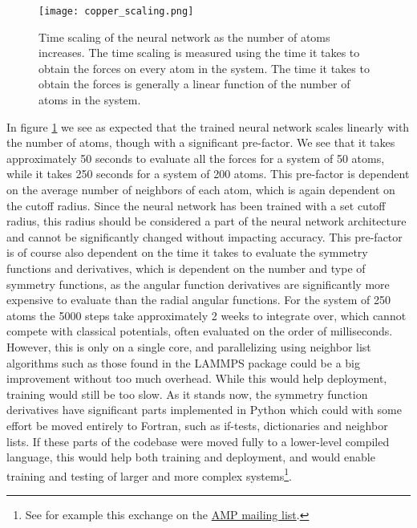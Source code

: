 \begin{figure}
\texttt{[image: copper\_scaling.png]}
\caption{Time scaling of the neural network as the number of atoms increases.
    The time scaling is measured using the time it takes to obtain
    the forces on every atom in the system. The time it takes to obtain
    the forces is generally a linear function of the number of atoms
    in the system.}
\label{fig:copper-scaling}
\end{figure}

In figure \ref{fig:copper-scaling} we see as expected that the 
trained neural network
scales linearly with the number of atoms, though with a significant pre-factor.
We see that it takes approximately 50 seconds to evaluate all the forces
for a system of 50 atoms, while it takes 250 seconds for a system of 200 atoms.
This pre-factor is dependent on the average number of neighbors
of each atom, which is again dependent on the cutoff radius.
Since the neural network has been trained with a set cutoff radius,
this radius should be considered a part of the neural network architecture
and cannot be significantly changed without impacting accuracy.
This pre-factor is of course also dependent on the time it takes to evaluate
the symmetry functions and derivatives, which is dependent on the number
and type of symmetry functions, as the angular function derivatives are significantly
more expensive to evaluate than the radial angular functions.
For the system of 250 atoms the 5000 steps take approximately 2 weeks
to integrate over, which cannot compete with classical potentials,
often evaluated on the order of milliseconds.
However, this is only on a single core, 
and parallelizing using neighbor list algorithms
such as those found in the LAMMPS package 
could be a big improvement without too much overhead.
While this would help deployment, training would still be too slow.
As it stands now, the symmetry function derivatives have significant parts
implemented in Python which could with some effort be moved entirely to Fortran,
such as if-tests, dictionaries and neighbor lists.
If these parts of the codebase were moved fully to a lower-level compiled
language, this would help both training and deployment, and would enable
training and testing of larger and more complex systems\footnote{
    See for example this exchange on the \href{
    https://listserv.brown.edu/cgi-bin/wa?A2=AMP-USERS;d7c6c98c.1904}{
    AMP mailing list}.}.

